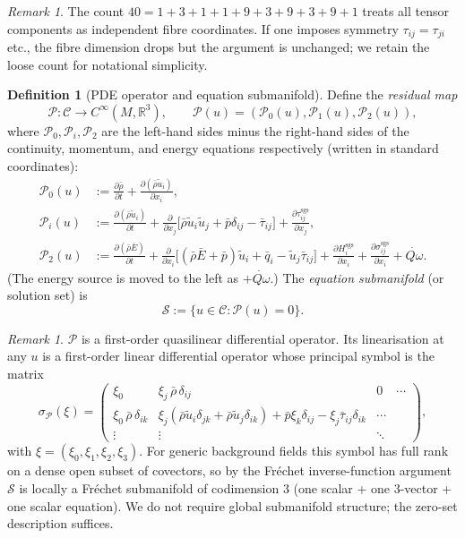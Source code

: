 \documentclass[11pt]{article}
\theoremstyle{definition}
\newtheorem{definition}[theorem]{Definition}
\theoremstyle{remark}
\newtheorem{remark}[theorem]{Remark}
\newcommand{\R}{\mathbb{R}}
\newcommand{\sgs}{\mathrm{sgs}}
\newcommand{\barrho}{\bar{\rho}}
\newcommand{\barp}{\bar{p}}
\newcommand{\barE}{\bar{E}}
\newcommand{\bartau}{\bar{\tau}}
\newcommand{\barq}{\bar{q}}
\newcommand{\tilu}{\widetilde{u}}
\newcommand{\Qdot}{\dot{Q\omega}}
\begin{document}
\begin{remark}
The count $40=1+3+1+1+9+3+9+3+9+1$ treats all tensor components as
independent fibre coordinates.  If one imposes symmetry $\tau_{ij}=\tau_{ji}$
etc., the fibre dimension drops but the argument is unchanged; we retain the
loose count for notational simplicity.
\end{remark}

\begin{definition}[PDE operator and equation submanifold]
Define the \emph{residual map}
\[
\mathcal P:\mathcal C\longrightarrow C^\infty(M,\R^3),\qquad
\mathcal P(u)=(\mathcal P_0(u),\mathcal P_1(u),\mathcal P_2(u)),
\]
where $\mathcal P_0,\mathcal P_i,\mathcal P_2$ are the left-hand sides minus
the right-hand sides of the continuity, momentum, and energy equations
respectively (written in standard coordinates):
\begin{align}
\mathcal P_0(u)&:=\frac{\partial\barrho}{\partial t}
+\frac{\partial(\barrho\tilu_i)}{\partial x_i},\\
\mathcal P_i(u)&:=\frac{\partial(\barrho\tilu_i)}{\partial t}
+\frac{\partial}{\partial x_j}\bigl[\barrho\tilu_i\tilu_j+\barp\delta_{ij}
-\bartau_{ij}\bigr]
+\frac{\partial\tau^{\sgs}_{ij}}{\partial x_j},\\
\mathcal P_2(u)&:=\frac{\partial(\barrho\barE)}{\partial t}
+\frac{\partial}{\partial x_i}\bigl[(\barrho\barE+\barp)\tilu_i
+\barq_i-\tilu_j\bartau_{ij}\bigr]
+\frac{\partial H^{\sgs}_i}{\partial x_i}
+\frac{\partial\sigma^{\sgs}_{ij}}{\partial x_i}+\Qdot .
\end{align}
(The energy source is moved to the left as $+\Qdot$.)  The
\emph{equation submanifold} (or solution set) is
\[
\mathcal S:=\{u\in\mathcal C:\mathcal P(u)=0\}.
\]
\end{definition}

\begin{remark}
$\mathcal P$ is a first-order quasilinear differential operator.  Its
linearisation at any $u$ is a first-order linear differential operator whose
principal symbol is the matrix
\[
\sigma_\mathcal P(\xi)=\begin{pmatrix}
\xi_0 & \xi_j\,\barrho\,\delta_{ij} & 0 & \cdots\\
\xi_0\,\barrho\,\delta_{ik} & \xi_j(\barrho\tilu_i\delta_{jk}+\barrho\tilu_j\delta_{ik})+\barp\xi_k\delta_{ij}-\xi_j\bartau_{ij}\delta_{ik} & \cdots\\
\vdots & \vdots & \ddots
\end{pmatrix},
\]
with $\xi=(\xi_0,\xi_1,\xi_2,\xi_3)$.  For generic background fields this
symbol has full rank on a dense open subset of covectors, so by the
Fr\'echet inverse-function argument $\mathcal S$ is locally a Fr\'echet
submanifold of codimension $3$ (one scalar + one 3-vector + one scalar
equation).  We do not require global submanifold structure; the zero-set
description suffices.
\end{remark}
\end{document}
